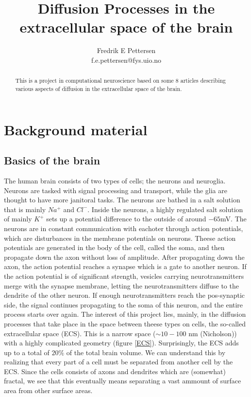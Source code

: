 \documentclass[a4paper,english, 10pt, twoside]{article}
\title{Diffusion Processes in the extracellular space of the brain}
\author{Fredrik E Pettersen\\ f.e.pettersen@fys.uio.no}
\begin{document}
\maketitle

\begin{abstract}
This is a project in computational neuroscience based on some 8 articles describing various aspects of diffusion in the extracellular space of the brain. 
\end{abstract}

\section{Background material}
\subsection{Basics of the brain}
The human brain consists of two types of cells; the neurons and neuroglia. 
Neurons are tasked with signal processing and transport, while the glia are thought to have more janitoral tasks. 
The neurons are bathed in a salt solution that is mainly $Na^+$ and $Cl^-$. 
Inside the neurons, a highly regulated salt solution of mainly $K^+$ sets up a potential difference to the outside of around $-65$mV.
The neurons are in constant communication with eachoter through action potentials, which are disturbances in the membrane potentials on neurons. 
Theese action potentials are generated in the body of the cell, called the soma, and then propagate down the axon without loss of amplitude. 
After propagating down the axon, the action potential reaches a synapse which is a gate to another neuron. 
If the action potential is of significant strength, vesicles carrying neurotransmitters merge with the synapse membrane, letting the neurotransmitters diffuse to the dendrite of the other neuron. 
If enough neurotransmitters reach the pos-synaptic side, the signal continues propagating to the soma of this neuron, and the entire process starts over again. 
The interest of this project lies, mainly, in the diffusion processes that take place in the space between theese types on cells, the so-called extracellular space (ECS). 
This is a narrow space ($\sim 10-100$ nm (Nicholson)) with a highly complicated geometry (figure \ref{ECS}). 
Surprisingly, the ECS adds up to a total of $20\%$ of the total brain volume. 
We can understand this by realizing that every part of a cell must be separated from another cell by the ECS. 
Since the cells consists of axons and dendrites which are (somewhat) fractal, we see that this eventually means separating a vast ammount of surface area from other surface areas.
\end{document}
